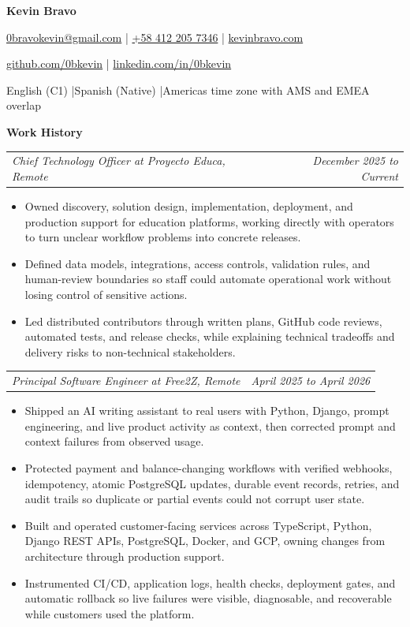 \documentclass[10pt,letterpaper]{article}
\makeatletter
\newcommand{\bodyfont}{\fontsize{10.5}{15.75}\selectfont}
\newcommand{\contactfont}{\fontsize{12}{15}\selectfont}
\newcommand{\sectiontitle}[1]{%
  \vspace{4pt}
  {\bodyfont\textbf{#1}}\par
  \nopagebreak[4]
  \vspace{2pt}
}
\newcommand{\roleline}[2]{%
  \begin{tabularx}{\textwidth}{@{}Xr@{}}
    \bodyfont\textit{#1} & \bodyfont\textit{#2}
  \end{tabularx}
  \nopagebreak[4]
  \vspace{1pt}
}
\makeatother
\begin{document}
\bodyfont
\raggedright

\begin{center}
  {\fontsize{14}{17}\selectfont\textbf{Kevin Bravo}}\par
  \vspace{3pt}
  {\contactfont
    \href{mailto:0bravokevin@gmail.com}{0bravokevin@gmail.com}
    \enspace|\enspace
    \href{tel:+584122057346}{+58 412 205 7346}
    \enspace|\enspace
    \href{https://kevinbravo.com}{kevinbravo.com}
  }\par
  {\contactfont
    \href{https://github.com/0bkevin}{github.com/0bkevin}
    \enspace|\enspace
    \href{https://www.linkedin.com/in/0bkevin/}{linkedin.com/in/0bkevin}
  }\par
  {\contactfont English (C1) \enspace|\enspace Spanish (Native) \enspace|\enspace Americas time zone with AMS and EMEA overlap}
\end{center}

\sectiontitle{Work History}

\roleline{Chief Technology Officer at Proyecto Educa, Remote}{December 2025 to Current}
\begin{itemize}
  \item Owned discovery, solution design, implementation, deployment, and production support for education platforms, working directly with operators to turn unclear workflow problems into concrete releases.
  \item Defined data models, integrations, access controls, validation rules, and human-review boundaries so staff could automate operational work without losing control of sensitive actions.
  \item Led distributed contributors through written plans, GitHub code reviews, automated tests, and release checks, while explaining technical tradeoffs and delivery risks to non-technical stakeholders.
\end{itemize}

\vspace{3pt}
\roleline{Principal Software Engineer at Free2Z, Remote}{April 2025 to April 2026}
\begin{itemize}
  \item Shipped an AI writing assistant to real users with Python, Django, prompt engineering, and live product activity as context, then corrected prompt and context failures from observed usage.
  \item Protected payment and balance-changing workflows with verified webhooks, idempotency, atomic PostgreSQL updates, durable event records, retries, and audit trails so duplicate or partial events could not corrupt user state.
  \item Built and operated customer-facing services across TypeScript, Python, Django REST APIs, PostgreSQL, Docker, and GCP, owning changes from architecture through production support.
  \item Instrumented CI/CD, application logs, health checks, deployment gates, and automatic rollback so live failures were visible, diagnosable, and recoverable while customers used the platform.
\end{itemize}
\end{document}
